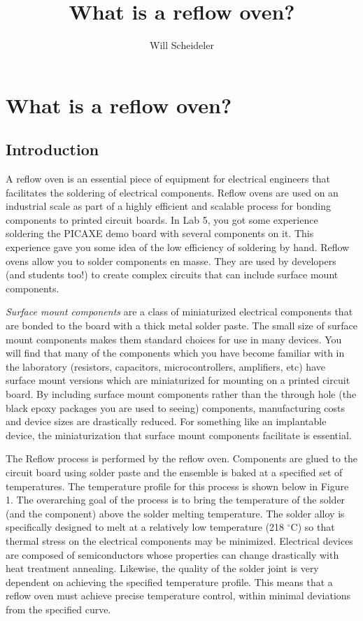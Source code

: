 \documentclass[10pt]{report}
\title{What is a reflow oven?}
\author{Will Scheideler}
\begin{document}
\section*{What is a reflow oven?}

\subsection*{Introduction}

\par A reflow oven is an essential piece of equipment for electrical engineers that facilitates the soldering of electrical components. Reflow ovens are used on an industrial scale as part of a highly efficient and scalable process for bonding components to printed circuit boards. In Lab 5, you got some experience soldering the PICAXE demo board with several components on it. This experience gave you some idea of the low efficiency of soldering by hand. Reflow ovens allow you to solder components en masse.  They are used by developers (and students too!) to create complex circuits that can include surface mount components.

\par \indent \emph{Surface mount components} are a class of miniaturized electrical components that are bonded to the board with a thick metal solder paste. The small size of surface mount components makes them standard choices for use in many devices. You will find that many of the components which you have become familiar with in the laboratory (resistors, capacitors, microcontrollers, amplifiers, etc) have surface mount versions which are miniaturized for mounting on a printed circuit board. By including surface mount components rather than the through hole (the black epoxy packages you are used to seeing) components, manufacturing costs and device sizes are drastically reduced. For something like an implantable device, the miniaturization that surface mount components facilitate is essential.

\par \indent The Reflow process is performed by the reflow oven. Components are glued to the circuit board using solder paste and the ensemble is baked at a specified set of temperatures. The temperature profile for this process is shown below in Figure 1. The overarching goal of the process is to bring the temperature of the solder (and the component) above the solder melting temperature. The solder alloy is specifically designed to melt at a relatively low temperature (218 $^\circ$C) so that thermal stress on the electrical components may be minimized. Electrical devices are composed of semiconductors whose properties can change drastically with heat treatment annealing. Likewise, the quality of the solder joint is very dependent on achieving the specified temperature profile. This means that a reflow oven must achieve precise temperature control, within minimal deviations from the specified curve.  
\end{document}
